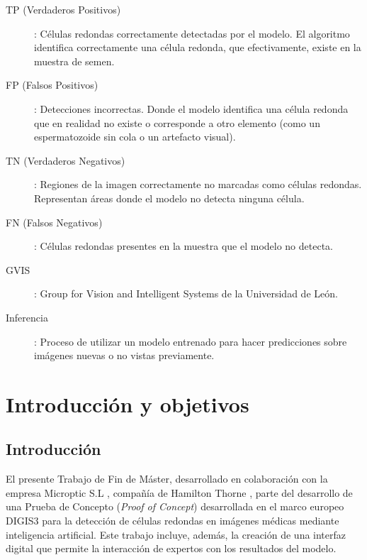 \documentclass[12pt,a4paper,onecolumn,oneside]{report}
\begin{document}
\begin{description}
  \item[TP (Verdaderos Positivos)]: Células redondas correctamente detectadas por el modelo. El algoritmo identifica correctamente una célula redonda, que efectivamente, existe en la muestra de semen.
  \item[FP (Falsos Positivos)]: Detecciones incorrectas. Donde el modelo identifica una célula redonda que en realidad no existe o corresponde a otro elemento (como un espermatozoide sin cola o un artefacto visual).
  \item[TN (Verdaderos Negativos)]: Regiones de la imagen correctamente no marcadas como células redondas. Representan áreas donde el modelo no detecta ninguna célula.
  \item[FN (Falsos Negativos)]: Células redondas presentes en la muestra que el modelo no detecta.
  \item[GVIS]:  Group for Vision and Intelligent Systems de la Universidad de León.  
  \item[Inferencia]: Proceso de utilizar un modelo entrenado para hacer predicciones sobre imágenes nuevas o no vistas previamente.
\end{description} 

\newpage
\renewcommand{\thepage}{\arabic{page}}
\setcounter{page}{1} %

\chapter{Introducción y objetivos} %
\label{Introducción y objetivos}
\section{Introducción}
\label{sec:Introducción}

El presente Trabajo de Fin de Máster, desarrollado en colaboración con la empresa Microptic S.L \cite{microptic}, compañía de Hamilton Thorne \cite{HamiltonThorneWeb}, 
parte del desarrollo de una Prueba de Concepto (\textit{Proof of Concept}) desarrollada en el marco europeo DIGIS3 \cite{digis3} para la detección de células redondas en imágenes médicas 
mediante inteligencia artificial. Este trabajo incluye, además, la creación de una interfaz digital que permite la interacción de expertos 
con los resultados del modelo.
\end{document}
